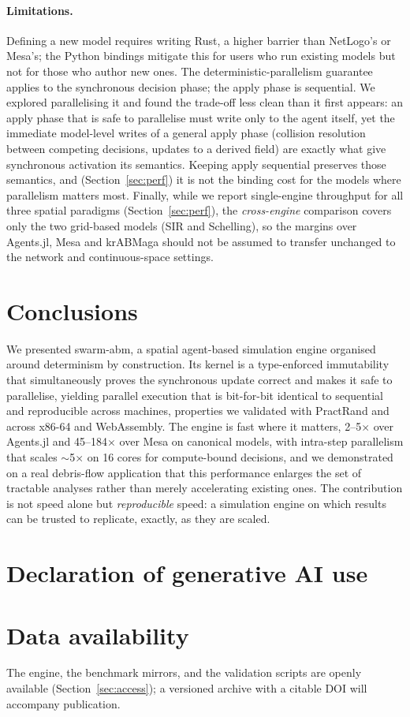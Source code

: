 \documentclass[review]{elsarticle}
\begin{document}
\paragraph{Limitations.}
Defining a new model requires writing Rust, a higher barrier than NetLogo's or
Mesa's; the Python bindings mitigate this for users who run existing models but
not for those who author new ones. The deterministic-parallelism guarantee
applies to the synchronous decision phase; the apply phase is sequential. We
explored parallelising it and found the trade-off less clean than it first
appears: an apply phase that is safe to parallelise must write only to the agent
itself, yet the immediate model-level writes of a general apply phase (collision
resolution between competing decisions, updates to a derived field) are exactly
what give synchronous activation its semantics. Keeping apply sequential
preserves those semantics, and (Section~\ref{sec:perf}) it is not the binding
cost for the models where parallelism matters most. Finally, while we report
single-engine throughput for all three spatial paradigms
(Section~\ref{sec:perf}), the \emph{cross-engine} comparison covers only the two
grid-based models (SIR and Schelling), so the margins over Agents.jl, Mesa and
krABMaga should not be assumed to transfer unchanged to the network and
continuous-space settings.

\section{Conclusions}
\label{sec:conclusion}

We presented swarm-abm, a spatial agent-based simulation engine organised around
determinism by construction. Its kernel is a type-enforced immutability that
simultaneously proves the synchronous update correct and makes it safe to
parallelise, yielding parallel execution that is bit-for-bit identical to
sequential and reproducible across machines, properties we validated with
PractRand and across x86-64 and WebAssembly. The engine is fast where it matters,
2--5$\times$ over Agents.jl and 45--184$\times$ over Mesa on canonical models,
with intra-step parallelism that scales $\sim$5$\times$ on 16 cores for
compute-bound decisions, and we demonstrated on a real debris-flow application
that this performance enlarges the set of tractable analyses rather than merely
accelerating existing ones. The contribution is not speed alone but
\emph{reproducible} speed: a simulation engine on which results can be trusted to
replicate, exactly, as they are scaled.

\section*{Declaration of generative AI use}

\section*{Data availability}
The engine, the benchmark mirrors, and the validation scripts are openly
available (Section~\ref{sec:access}); a versioned archive with a citable DOI
will accompany publication.


\end{document}
